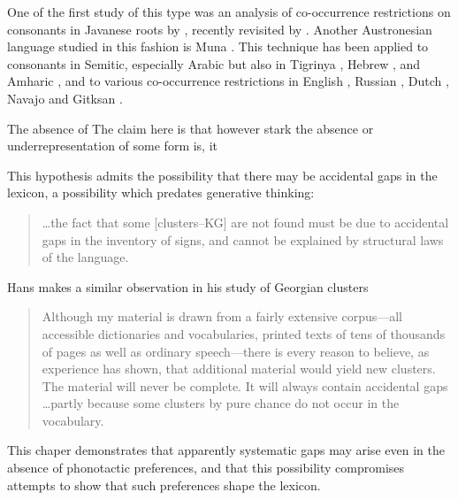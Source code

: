 One of the first study of this type was an analysis of co-occurrence restrictions on consonants in Javanese roots by \citet{Mester1988}, recently revisited by \citet{Graff2011}. 
Another Austronesian language studied in this fashion is Muna \citep{Coetzee2008a,Anttila2008}.
This technique has been applied to consonants in Semitic, especially Arabic \citep{McCarthy1988,McCarthy1994,Pierrehumbert1993,Frisch1996,Frisch2004,Coetzee2008a} but also in Tigrinya \citep{Buckley1997}, Hebrew \citep{Berent2003}, and Amharic \citep{Colavin2010}, and to various co-occurrence restrictions in English \citep{Berkley1994b,Berkley1994a,Pierrehumbert1994,Dmitrieva2008a,Dmitrieva2008b,Coetzee2008b}, Russian \citep{Padgett1992}, Dutch \citep{Graff2011}, Navajo \citep{Martin2007,Martin2011} and Gitksan \citep{Brown2010}.

The absence of 
The claim here is that however stark the absence or underrepresentation of some form is, it 

This hypothesis admits the possibility that there may be accidental gaps in the lexicon, a possibility which predates generative thinking:

\begin{quote}
\ldots{}the fact that some [clusters--KG] are not found must be due to accidental gaps in the inventory of signs, and cannot be explained by structural laws of the language. \citep[][16]{Fischer-Jorgensen1952}
\end{quote}

\noindent
Hans \citeauthor{Vogt1954} makes a similar observation in his study of Georgian clusters

\begin{quote}
Although my material is drawn from a fairly extensive corpus---all accessible dictionaries and vocabularies, printed texts of tens of thousands of pages as well as ordinary speech---there is every reason to believe, as experience has shown, that additional material would yield new clusters. The material will never be complete. It will always contain accidental gaps \ldots partly because some clusters by pure chance do not occur in the vocabulary. \citep[][30]{Vogt1954}
\end{quote}

\citet{Chomsky1965}

This chaper demonstrates that apparently systematic gaps may arise even in the absence of phonotactic preferences, and that this possibility compromises attempts to show that such preferences shape the lexicon. 




